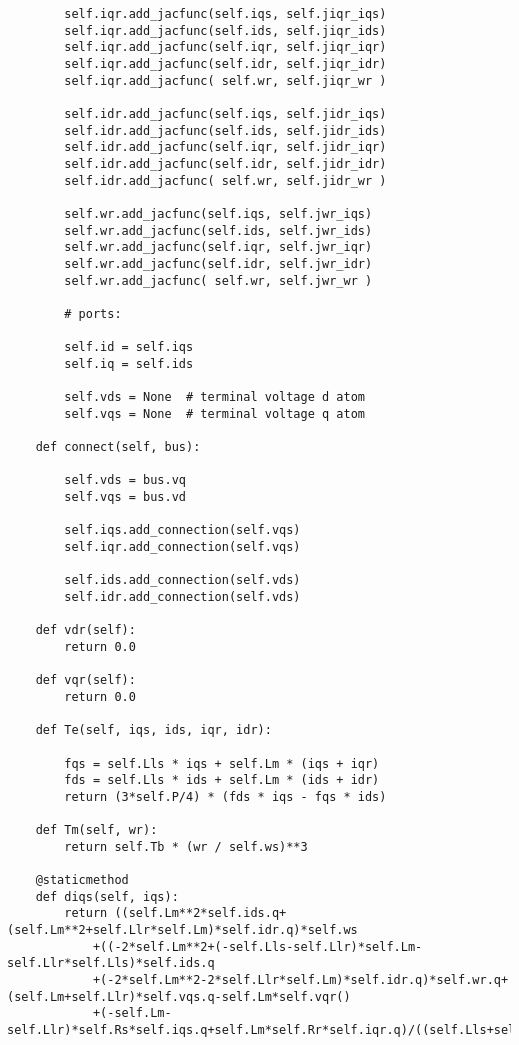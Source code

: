 \begin{lstlisting}
        self.iqr.add_jacfunc(self.iqs, self.jiqr_iqs)
        self.iqr.add_jacfunc(self.ids, self.jiqr_ids)
        self.iqr.add_jacfunc(self.iqr, self.jiqr_iqr)
        self.iqr.add_jacfunc(self.idr, self.jiqr_idr)
        self.iqr.add_jacfunc( self.wr, self.jiqr_wr )

        self.idr.add_jacfunc(self.iqs, self.jidr_iqs)
        self.idr.add_jacfunc(self.ids, self.jidr_ids)
        self.idr.add_jacfunc(self.iqr, self.jidr_iqr)
        self.idr.add_jacfunc(self.idr, self.jidr_idr)
        self.idr.add_jacfunc( self.wr, self.jidr_wr )

        self.wr.add_jacfunc(self.iqs, self.jwr_iqs)
        self.wr.add_jacfunc(self.ids, self.jwr_ids)
        self.wr.add_jacfunc(self.iqr, self.jwr_iqr)
        self.wr.add_jacfunc(self.idr, self.jwr_idr)
        self.wr.add_jacfunc( self.wr, self.jwr_wr )

        # ports:

        self.id = self.iqs
        self.iq = self.ids

        self.vds = None  # terminal voltage d atom
        self.vqs = None  # terminal voltage q atom

    def connect(self, bus):

        self.vds = bus.vq
        self.vqs = bus.vd

        self.iqs.add_connection(self.vqs)
        self.iqr.add_connection(self.vqs)

        self.ids.add_connection(self.vds)
        self.idr.add_connection(self.vds)

    def vdr(self):
        return 0.0

    def vqr(self):
        return 0.0

    def Te(self, iqs, ids, iqr, idr):

        fqs = self.Lls * iqs + self.Lm * (iqs + iqr)
        fds = self.Lls * ids + self.Lm * (ids + idr)
        return (3*self.P/4) * (fds * iqs - fqs * ids)

    def Tm(self, wr):
        return self.Tb * (wr / self.ws)**3

    @staticmethod
    def diqs(self, iqs):
        return ((self.Lm**2*self.ids.q+(self.Lm**2+self.Llr*self.Lm)*self.idr.q)*self.ws
	        +((-2*self.Lm**2+(-self.Lls-self.Llr)*self.Lm-self.Llr*self.Lls)*self.ids.q
            +(-2*self.Lm**2-2*self.Llr*self.Lm)*self.idr.q)*self.wr.q+(self.Lm+self.Llr)*self.vqs.q-self.Lm*self.vqr()
            +(-self.Lm-self.Llr)*self.Rs*self.iqs.q+self.Lm*self.Rr*self.iqr.q)/((self.Lls+self.Llr)*self.Lm+self.Llr*self.Lls)


\end{lstlisting}
